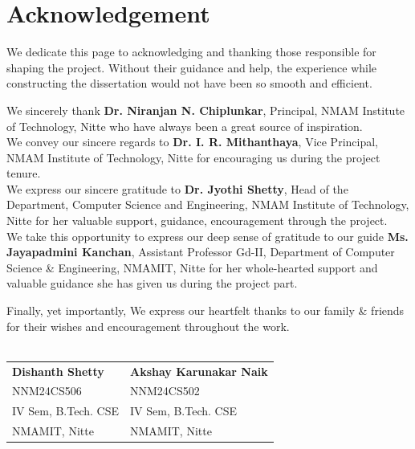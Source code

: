 \documentclass[12pt,a4paper]{report}
\begin{document}
\chapter*{Acknowledgement}
We dedicate this page to acknowledging and thanking those responsible for shaping the project. Without their guidance and help, the experience while constructing the dissertation would not have been so smooth and efficient.
\par
\vspace{0.15in}
\noindent We sincerely thank  \textbf{Dr. Niranjan N. Chiplunkar}, Principal, NMAM Institute of Technology, Nitte who have always been a great source of inspiration.\vspace{0.15in}\\
\noindent We convey our sincere regards to \textbf{Dr. I. R. Mithanthaya}, Vice Principal, NMAM Institute of Technology, Nitte for encouraging us during the project tenure. \vspace{0.15in}\\
\noindent We express our sincere gratitude to \textbf{Dr. Jyothi Shetty}, Head of the Department, Computer Science and Engineering, NMAM Institute of Technology, Nitte for her valuable support, guidance, encouragement through the project.
\vspace{0.15in}\\
\noindent We take this opportunity to express our deep sense of gratitude to our guide \textbf{Ms. Jayapadmini Kanchan}, Assistant Professor Gd-II, Department of Computer Science \& Engineering, NMAMIT, Nitte for her whole-hearted support and valuable guidance she has given us during the project part.
\par
\vspace{0.15in}
\noindent Finally, yet importantly, We express our heartfelt thanks to our family \& friends for their wishes and encouragement throughout the work.
\\
\\

\begin{flushright}
\begin{tabular}{p{10cm} p{10cm}}
\textbf{Dishanth Shetty} & \textbf{Akshay Karunakar Naik} \\
NNM24CS506 & NNM24CS502 \\
IV Sem, B.Tech. CSE & IV Sem, B.Tech. CSE \\
NMAMIT, Nitte & NMAMIT, Nitte \\
\end{tabular}
\end{flushright}
\end{document}

